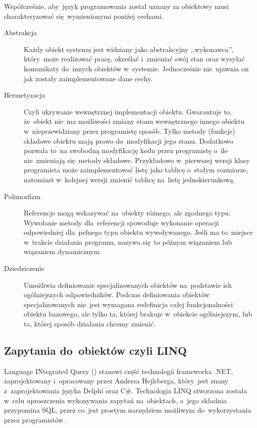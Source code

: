 Współcześnie, aby~język programowania został uznany za obiektowy musi charakteryzować się~wymienionymi poniżej cechami.
\begin{description}
	\item[Abstrakcja] Każdy obiekt systemu jest widziany jako abstrakcyjny ,,wykonawca'', który~może realizować pracę, określać i~zmieniać swój stan oraz wysyłać komunikaty do~innych obiektów w~systemie. Jednocześnie nie~ujawnia on jak zostały zaimplementowane dane cechy.
	\item[Hermetyzacja] Czyli ukrywanie wewnętrznej implementacji obiektu. Gwarantuje to, że~obiekt nie~ma możliwości zmiany stanu wewnętrznego innego obiektu w~nieprzewidziany przez programistę sposób. Tylko metody (funkcje) składowe obiektu mają prawo do~modyfikacji jego stanu. Dodatkowo pozwala to~na swobodną modyfikację kodu przez programistę o~ile nie~zmieniają się~metody składowe. Przykładowo w~pierwszej wersji klasy programista może zaimplementować listę jako tablicę o~stałym rozmiarze, natomiast w~kolejnej wersji zmienić tablicę na~listę jednokierunkową.
	\item[Polimorfizm] Referencje mogą wskazywać na~obiekty różnego, ale zgodnego typu. Wywołanie metody dla~referencji spowoduje wykonanie operacji odpowiedniej dla~pełnego typu obiektu wywoływanego. Jeśli ma to~miejsce w~trakcie działania programu, nazywa się~to późnym wiązaniem lub wiązaniem dynamicznym.
	\item[Dziedziczenie] Umożliwia definiowanie specjalizowanych obiektów na~podstawie ich ogólniejszych odpowiedników. Podczas definiowania obiektów specjalizowanych nie~jest wymagana redefinicja całej funkcjonalności obiektu bazowego, ale tylko ta, której brakuje w~obiekcie ogólniejszym, lub ta, której sposób działania chcemy zmienić.
	
\end{description}

\subsection{Zapytania do~obiektów czyli LINQ\label{sec:linq}}
Language INtegrated Query () stanowi część technologii frameworka .NET, zaprojektowany i~opracowany przez Andersa Hejlsberga, który~jest znany z~zaprojektowania języka Delphi oraz C\#. Technologia LINQ stworzona została w~celu uproszczenia wykonywania zapytań na~obiektach, a~jego składnia przypomina SQL, przez co~jest prostym narzędziem możliwym do~wykorzystania przez programistów.

